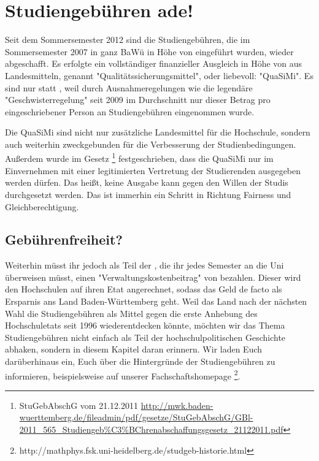 \section{Studiengebühren ade!}

Seit dem Sommersemester 2012 sind die Studiengebühren, die im Sommersemester 2007 in ganz BaWü in Höhe von  eingeführt wurden, wieder abgeschafft. Es erfolgte ein vollständiger finanzieller Ausgleich in Höhe von  aus Landesmitteln, genannt "Qualitätssicherungsmittel", oder liebevoll: "QuaSiMi". Es sind nur \EUR{\quasimi} statt , weil durch Ausnahmeregelungen wie die legendäre "Geschwisterregelung" seit 2009 im Durchschnitt nur dieser Betrag pro eingeschriebener Person an Studiengebühren eingenommen wurde.

Die QuaSiMi sind nicht nur zusätzliche Landesmittel für die Hochschule, sondern auch weiterhin zweckgebunden für die Verbesserung der Studienbedingungen. Außerdem wurde im Gesetz \footnote{StuGebAbschG vom 21.12.2011 \url{http://mwk.baden-wuerttemberg.de/fileadmin/pdf/gesetze/StuGebAbschG/GBl-2011_565_Studiengeb\%C3\%BChrenabschaffungsgesetz_21122011.pdf}} festgeschrieben, dass die QuaSiMi nur im Einvernehmen mit einer legitimierten Vertretung der Studierenden ausgegeben werden dürfen. Das heißt, keine Ausgabe kann gegen den Willen der Studis durchgesetzt werden. Das ist immerhin ein Schritt in Richtung Fairness und Gleichberechtigung.

\subsection*{Gebührenfreiheit?}
Weiterhin müsst ihr jedoch als Teil der \EUR{\beitragssumme}, die ihr jedes Semester an die Uni überweisen müsst, einen "Verwaltungskostenbeitrag" von \EUR{\verwaltungsbetrag} bezahlen. Dieser wird den Hochschulen auf ihren Etat angerechnet, sodass das Geld de facto als Ersparnis ans Land Baden-Württemberg geht. Weil das Land nach der nächsten Wahl die Studiengebühren als Mittel gegen die erste Anhebung des Hochschuletats seit 1996 wiederentdecken könnte, möchten wir das Thema Studiengebühren nicht einfach als Teil der hochschulpolitischen Geschichte abhaken, sondern in diesem Kapitel daran erinnern.
Wir laden Euch darüberhinaus ein, Euch über die Hintergründe der Studiengebühren zu informieren, beispielsweise auf unserer Fachschaftshomepage \footnote{http://mathphys.fsk.uni-heidelberg.de/studgeb-historie.html}.
%

